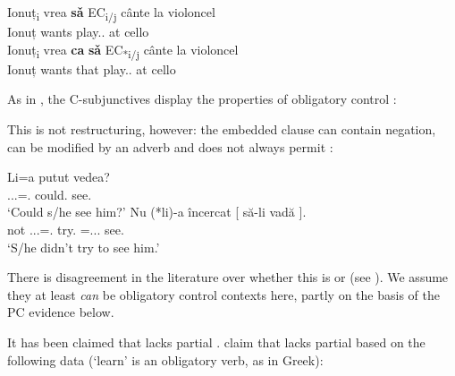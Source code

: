 \documentclass[output=paper]{langsci/langscibook}
\begin{document}
\ea%
    \label{ex:key:24.23}
	\ea
		\gll Ionuț\textsubscript{i} vrea     \textbf{sǎ} EC\textsubscript{i/j} cânte     la violoncel\\
        Ionuț  wants     \Sbjv{}   {}  play.\Sbjv{}.\Tsg{}  at cello\\
	\ex	\gll Ionuț\textsubscript{i}  vrea   \textbf{ca} \textbf{sǎ}   EC\textsubscript{*i/j} cânte     la violoncel\\
        Ionuț  wants   that   \Sbjv{}  {}   play.\Sbjv{}.\Tsg{}  at cello\\
	\z
\z

As in , the C-subjunctives display the properties of obligatory
control
\parencite{Landau2004,Alboiu2007,AlexiadouEtAl2010,Hill2012,Nicolae2013}:

\ea%
    \label{ex:key:24.24}
\z

This is not restructuring, however: the embedded clause can contain negation,
can be modified by an adverb and does not always permit 
\parencite{Alboiu2007,AlexiadouEtAl2010}:

\ea%
    \label{ex:key:24.25} \citep[8]{Alboiu2007}
	\ea
		\gll Li=a         putut     vedea?\\
        \Cl{}.\Tsg.\M.\Acc{}=\Aux.\Tsg{}   could.\Ptcp{}   see.\Tsg{}\\
		\glt ‘Could s/he see him?’
	\ex
		\gll Nu (*li)-a             încercat    [ să-li       vadă ].\\
        not \hphantom{(*}\Cl.\Tsg.\M.\Acc{}=\Aux.\Tsg{} try.\Ptcp{} {} \Sbjv=\Cl.\Tsg.\M.\Acc{} see.\Tsg\\
		\glt ‘S/he didn’t try to see him.’
	\z
\z

There is disagreement in the literature over whether this is  or 
(see \citealt{Nicolae2013}). We assume they at least \emph{can} be obligatory
control contexts here, partly on the basis of the \gls{PC} evidence below.

It has been claimed that  lacks partial .
\citet{AlexiadouEtAl2010} claim that  lacks partial  based on
the following data (‘learn’ is an obligatory  verb, as in Greek):
\end{document}
